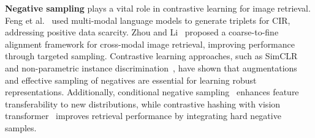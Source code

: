 \textbf{Negative sampling} plays a vital role in contrastive learning for image retrieval. Feng et al.~\cite{feng2024improvingcomposedimageretrieval} used multi-modal language models to generate triplets for CIR, addressing positive data scarcity. Zhou and Li~\cite{zhou2024coarsetofinealignmentmakesbetter} proposed a coarse-to-fine alignment framework for cross-modal image retrieval, improving performance through targeted sampling. Contrastive learning approaches, such as SimCLR~\cite{chen2020simpleframeworkcontrastivelearning} and non-parametric instance discrimination~\cite{wu2018unsupervisedfeaturelearningnonparametric}, have shown that augmentations and effective sampling of negatives are essential for learning robust representations. Additionally, conditional negative sampling~\cite{wu2020conditionalnegativesamplingcontrastive} enhances feature transferability to new distributions, while contrastive hashing with vision transformer~\cite{https://doi.org/10.1002/int.23082} improves retrieval performance by integrating hard negative samples.